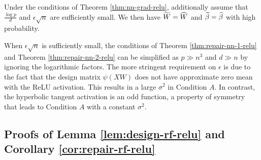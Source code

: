 \begin{thm}\label{thm:repair-nn-2-relu}
Under the conditions of Theorem \ref{thm:nn-grad-relu}, additionally assume that $\frac{\log p}{d}$ and $\epsilon\sqrt{n}$ are sufficiently small. We then have $\widetilde{W}=\widehat{W}$ and $\widetilde{\beta}=\widehat{\beta}$ with high probability.
\end{thm}

\begin{remark}
When $\epsilon\sqrt{n}$ is sufficiently small, the conditions of Theorem \ref{thm:repair-nn-1-relu} and Theorem \ref{thm:repair-nn-2-relu} can be simplified as $p \gg n^3$ and $d\gg n$ by ignoring the logarithmic factors. The more stringent requirement on $\epsilon$ is due to the fact that the design matrix $\psi(XW)$ does not have approximate zero mean with the ReLU activation. This results in a large $\sigma^2$ in Condition $A$. In contrast, the hyperbolic tangent activation is an odd function, a property of symmetry that leads to Condition $A$ with a constant $\sigma^2$.
\end{remark}


\subsection{Proofs of Lemma \ref{lem:design-rf-relu} and Corollary \ref{cor:repair-rf-relu}}

